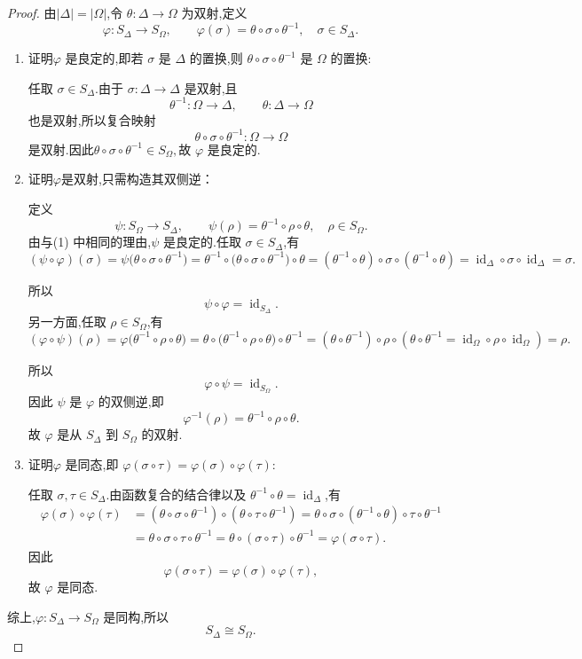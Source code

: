 \begin{proof}
由$|\Delta|=|\Omega|$,令 $\theta:\Delta\to\Omega$ 为双射,定义
\[
\varphi:S_\Delta\to S_\Omega,
\qquad \varphi(\sigma)=\theta\circ\sigma\circ\theta^{-1},
\quad \sigma\in S_\Delta.
\]
	\begin{enumerate}[label=(\arabic*)]
		\item 证明$\varphi$ 是良定的,即若 $\sigma$ 是 $\Delta$ 的置换,则 $\theta\circ\sigma\circ\theta^{-1}$ 是 $\Omega$ 的置换:
		
		任取 $\sigma\in S_\Delta$.由于 $\sigma:\Delta\to\Delta$ 是双射,且
		\[
		\theta^{-1}:\Omega\to\Delta,
		\qquad
		\theta:\Delta\to\Omega
		\]
		也是双射,所以复合映射
		\[
		\theta\circ\sigma\circ\theta^{-1}:\Omega\to\Omega
		\]
		是双射.因此$	\theta\circ\sigma\circ\theta^{-1}\in S_\Omega,$故 $\varphi$ 是良定的.
		\item 证明$\varphi$是双射,只需构造其双侧逆：
		
		定义
		\[
		\psi:S_\Omega\to S_\Delta,
		\qquad
		\psi(\rho)=\theta^{-1}\circ\rho\circ\theta,
		\quad \rho\in S_\Omega.
		\]
		由与(1) 中相同的理由,$\psi$ 是良定的.任取
		$\sigma\in S_\Delta$,有\[ (\psi\circ\varphi)(\sigma)
			=\psi\bigl(\theta\circ\sigma\circ\theta^{-1}\bigr)=\theta^{-1}\circ
			\bigl(\theta\circ\sigma\circ\theta^{-1}\bigr)
			\circ\theta=(\theta^{-1}\circ\theta)\circ\sigma
			\circ(\theta^{-1}\circ\theta)=\operatorname{id}_\Delta\circ\sigma
			\circ\operatorname{id}_\Delta=\sigma. \]
	
		所以
		\[
		\psi\circ\varphi=\operatorname{id}_{S_\Delta}.
		\]
		另一方面,任取 $\rho\in S_\Omega$,有\[ (\varphi\circ\psi)(\rho)
			=\varphi\bigl(\theta^{-1}\circ\rho\circ\theta\bigr)=\theta\circ
			\bigl(\theta^{-1}\circ\rho\circ\theta\bigr)
			\circ\theta^{-1}=(\theta\circ\theta^{-1})\circ\rho
			\circ(\theta\circ\theta^{-1}=\operatorname{id}_\Omega\circ\rho
			\circ\operatorname{id}_\Omega)=\rho. \]

		所以
		\[
		\varphi\circ\psi=\operatorname{id}_{S_\Omega}.
		\]
		因此 $\psi$ 是 $\varphi$ 的双侧逆,即
		\[
		\varphi^{-1}(\rho)
		=\theta^{-1}\circ\rho\circ\theta.
		\]
		故 $\varphi$ 是从 $S_\Delta$ 到 $S_\Omega$ 的双射.
		
		\item 证明$\varphi$ 是同态,即 $\varphi(\sigma\circ\tau)=\varphi(\sigma)\circ\varphi(\tau)$:
		
		任取 $\sigma,\tau\in S_\Delta$.由函数复合的结合律以及
		$\theta^{-1}\circ\theta=\operatorname{id}_\Delta$,有
		\begin{align*}
			\varphi(\sigma)\circ\varphi(\tau)
			&=(\theta\circ\sigma\circ\theta^{-1})
			\circ(\theta\circ\tau\circ\theta^{-1})=\theta\circ\sigma\circ
			(\theta^{-1}\circ\theta)
			\circ\tau\circ\theta^{-1}\\
			&=\theta\circ\sigma\circ\tau\circ\theta^{-1}=\theta\circ(\sigma\circ\tau)\circ\theta^{-1}=\varphi(\sigma\circ\tau).
		\end{align*}
		因此
		\[
		\varphi(\sigma\circ\tau)
		=\varphi(\sigma)\circ\varphi(\tau),
		\]
		故 $\varphi$ 是同态.
	\end{enumerate}
	
	综上,$\varphi:S_\Delta\to S_\Omega$ 是同构,所以
	\[
	S_\Delta\cong S_\Omega.
	\]
\end{proof}
